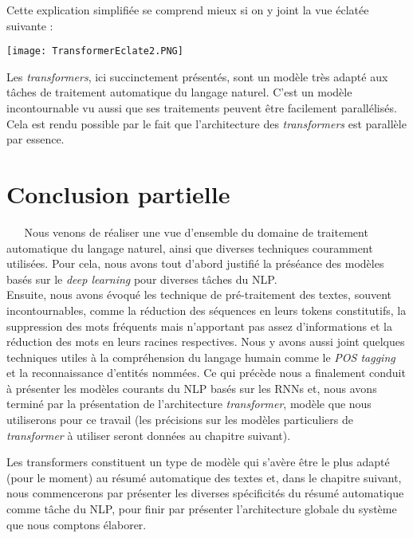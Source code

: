 Cette explication simplifiée se comprend mieux si on y joint la vue éclatée suivante :\newpage
\begin{center}
\texttt{[image: TransformerEclate2.PNG]}
\label{VueEclateeTrans}
\end{center}
Les \textit{transformers}, ici succinctement présentés, sont un modèle très adapté aux tâches de traitement automatique du langage naturel. C'est un modèle incontournable vu aussi que ses traitements peuvent être facilement parallélisés. Cela est rendu possible par le fait que l'architecture des \textit{transformers} est parallèle par essence. 
\section{Conclusion partielle}
$ _{} $ $ _{} $ $ _{} $ $ _{} $ $ _{} $Nous venons de réaliser une vue d'ensemble du domaine de traitement automatique du langage naturel, ainsi que diverses techniques couramment utilisées. Pour cela, nous avons tout d'abord justifié la préséance des modèles basés sur le \textit{deep learning} pour diverses tâches du NLP.\\
Ensuite, nous avons évoqué les technique de pré-traitement des textes, souvent in\-con\-tour\-na\-bles, comme la réduction des séquences en leurs tokens constitutifs, la suppression des mots fréquents mais n'apportant pas assez d'informations et la réduction des mots en leurs racines respectives. Nous y avons aussi joint quelques techniques utiles à la compréhension du langage humain comme le \textit{POS tagging} et la reconnaissance d'entités nommées. Ce qui précède nous a finalement conduit à présenter les modèles courants du NLP basés sur les RNNs et, nous avons terminé par la présentation de l'architecture \textit{transformer}, modèle que nous utiliserons pour ce travail (les précisions sur les modèles particuliers de \textit{transformer} à utiliser seront données au chapitre suivant).

Les transformers constituent un type de modèle qui s'avère être le plus adapté (pour le moment) au résumé automatique des textes et, dans le chapitre suivant, nous commencerons par présenter les diverses spécificités du résumé automatique comme tâche du NLP, pour finir par présenter l'architecture globale du système que nous comptons élaborer.